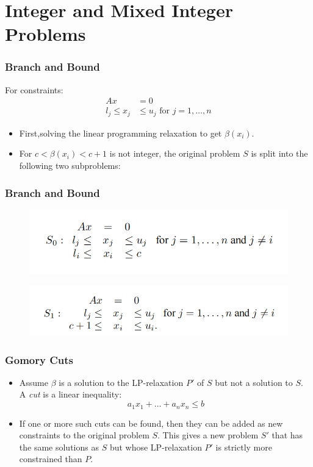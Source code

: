 \documentclass[aspectratio=169%
,serif,mathserif]{beamer}
\begin{document}
\section{Integer and Mixed Integer Problems}
\begin{frame}
	\frametitle{Branch and Bound}
	For constraints:
	\begin{equation}
		\begin{aligned}
			A x &=0 \\
			l_{j} \leq x_{j} & \leq u_{j} \text { for } j=1, \ldots, n
		\end{aligned}
	\end{equation}

	\begin{itemize}
		\item First,solving the linear programming relaxation to get $\beta\left(x_{i}\right)$.
		\item For $c <\beta\left(x_{i}\right) <c+1$ is not integer, the original problem $S$ is split into the following
		two subproblems: 
	\end{itemize}
\end{frame}

\begin{frame}
	\frametitle{Branch and Bound}
	\begin{figure}[htbp]
		\includegraphics[width=.5\linewidth]{6.png}
	\end{figure}

	\begin{figure}[htbp]
		\includegraphics[width=.5\linewidth]{7.png}
	\end{figure}
\end{frame}

\begin{frame}
	\frametitle{Gomory Cuts}
	\begin{itemize}
		\item Assume $\beta$ is a solution to the LP-relaxation $P'$ of $S$ but not a solution
		to $S$. A \emph{cut} is a linear inequality:
		$$
		a_{1} x_{1}+\ldots+a_{n} x_{n} \leq b
		$$

		\item If one or more such cuts can be found, then they can be added as new constraints to the original problem $S$. This
		gives a new problem $S'$ that has the same solutions as $S$ but whose LP-relaxation $P'$ is strictly more
		constrained than $P$.
	\end{itemize}
\end{frame}
\end{document}
